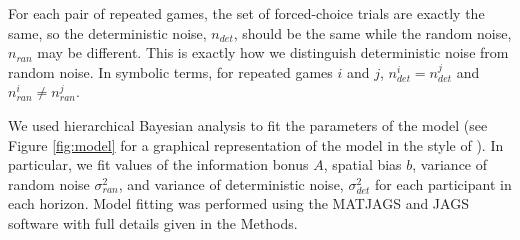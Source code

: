 \documentclass[12pt]{article}
\begin{document}
	
	For each pair of repeated games, the set of forced-choice trials are exactly the same, so the deterministic noise, $n_{det}$, should be the same while the random noise, $n_{ran}$ may be different. This is exactly how we distinguish deterministic noise from random noise. In symbolic terms, for repeated games $i$ and $j$,  $n_{det}^i=n_{det}^j$  and $n_{ran}^i \neq n_{ran}^j$.
	
	We used hierarchical Bayesian analysis to fit the parameters of the model (see Figure \ref{fig:model} for a graphical representation of the model in the style of \cite{lee2014}). In particular, we fit values of the information bonus $A$, spatial bias $b$, variance of random noise $\sigma_{ran}^2$, and variance of deterministic noise, $\sigma_{det}^2$ for each participant in each horizon. Model fitting was performed using the MATJAGS and JAGS software \citep{jags, matjags} with full details given in the Methods.  
	
\end{document}
